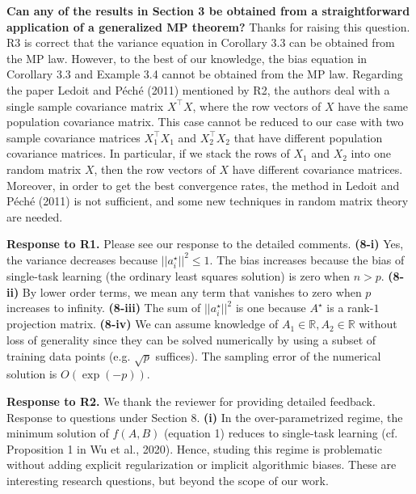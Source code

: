 \documentclass{article}
\begin{document}
	\textbf{Can any of the results in Section 3 be obtained from a straightforward application of a generalized MP theorem?}
	Thanks for raising this question. R3 is correct that the variance equation in Corollary 3.3 can be obtained from the MP law.
	However, to the best of our knowledge, the bias equation in Corollary 3.3 and Example 3.4 cannot be obtained from the MP law.
	Regarding the paper Ledoit and P{\'e}ch{\'e} (2011) mentioned by R2, the authors deal with a single sample covariance matrix $X^\top X$, where the row vectors of $X$ have the same population covariance matrix. This case cannot be reduced to our case with two sample covariance matrices $X_1^\top X_1$ and $X_2^\top X_2$ that have different population covariance matrices. In particular, if we stack the rows of $X_1$ and $X_2$ into one random matrix $X$, then the row vectors of $X$ have different covariance matrices. Moreover, in order to get the best convergence rates, the method in  Ledoit and P{\'e}ch{\'e} (2011) is not sufficient, and some new techniques in random matrix theory are needed.

	\textbf{Response to R1.} Please see our response to the detailed comments.
	\textbf{(8-i)} Yes, the variance decreases because $||{a_i^{\star}}||^2 \le 1$.
	The bias increases because the bias of single-task learning (the ordinary least squares solution) is zero when $n > p$.
	\textbf{(8-ii)} By lower order terms, we mean any term that vanishes to zero when $p$ increases to infinity.
	\textbf{(8-iii)} The sum of $||{a_i^{\star}}||^2$ is one because $A^{\star}$ is a rank-$1$ projection matrix.
	\textbf{(8-iv)} %
	We can assume knowledge of $A_1 \in \mathbb R, A_2 \in \mathbb R$ without loss of generality since they can be solved numerically by using a subset of training data points (e.g. $\sqrt{p}$ suffices).
	The sampling error of the numerical solution is $O(\exp(-p))$.

	\textbf{Response to R2.} We thank the reviewer for providing detailed feedback.
	Response to questions under Section 8.
	\textbf{(i)}
	In the over-parametrized regime, the minimum solution of $f(A ,B)$ (equation 1) reduces to single-task learning  (cf. Proposition 1 in Wu et al., 2020).
	Hence, studing this regime is problematic without adding explicit regularization or implicit algorithmic biases.
	These are interesting research questions, but beyond the scope of our work.
\end{document}

